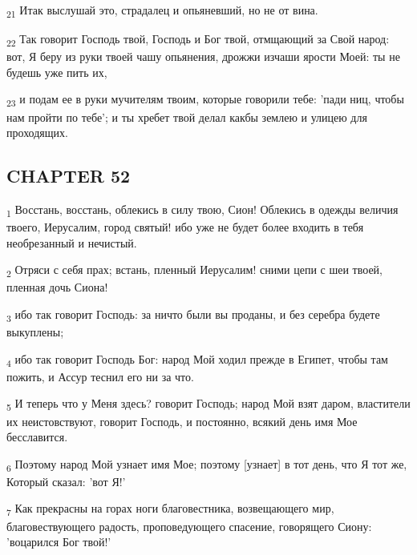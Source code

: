 \begin{tcolorbox}
\textsubscript{21} Итак выслушай это, страдалец и опьяневший, но не от вина.
\end{tcolorbox}
\begin{tcolorbox}
\textsubscript{22} Так говорит Господь твой, Господь и Бог твой, отмщающий за Свой народ: вот, Я беру из руки твоей чашу опьянения, дрожжи изчаши ярости Моей: ты не будешь уже пить их,
\end{tcolorbox}
\begin{tcolorbox}
\textsubscript{23} и подам ее в руки мучителям твоим, которые говорили тебе: 'пади ниц, чтобы нам пройти по тебе'; и ты хребет твой делал какбы землею и улицею для проходящих.
\end{tcolorbox}
\subsection{CHAPTER 52}
\begin{tcolorbox}
\textsubscript{1} Восстань, восстань, облекись в силу твою, Сион! Облекись в одежды величия твоего, Иерусалим, город святый! ибо уже не будет более входить в тебя необрезанный и нечистый.
\end{tcolorbox}
\begin{tcolorbox}
\textsubscript{2} Отряси с себя прах; встань, пленный Иерусалим! сними цепи с шеи твоей, пленная дочь Сиона!
\end{tcolorbox}
\begin{tcolorbox}
\textsubscript{3} ибо так говорит Господь: за ничто были вы проданы, и без серебра будете выкуплены;
\end{tcolorbox}
\begin{tcolorbox}
\textsubscript{4} ибо так говорит Господь Бог: народ Мой ходил прежде в Египет, чтобы там пожить, и Ассур теснил его ни за что.
\end{tcolorbox}
\begin{tcolorbox}
\textsubscript{5} И теперь что у Меня здесь? говорит Господь; народ Мой взят даром, властители их неистовствуют, говорит Господь, и постоянно, всякий день имя Мое бесславится.
\end{tcolorbox}
\begin{tcolorbox}
\textsubscript{6} Поэтому народ Мой узнает имя Мое; поэтому [узнает] в тот день, что Я тот же, Который сказал: 'вот Я!'
\end{tcolorbox}
\begin{tcolorbox}
\textsubscript{7} Как прекрасны на горах ноги благовестника, возвещающего мир, благовествующего радость, проповедующего спасение, говорящего Сиону: 'воцарился Бог твой!'
\end{tcolorbox}
